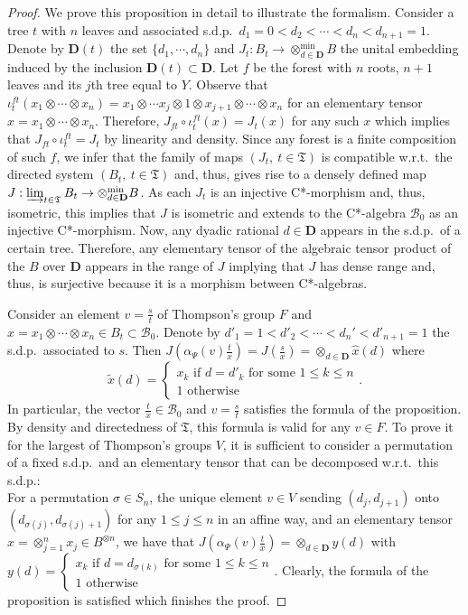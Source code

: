 \documentclass[a4paper,12pt]{amsart}
\numberwithin{equation}{section}
\theoremstyle{definition}
\newcommand{\al}{\alpha}
\newcommand{\scrB}{\mathscr B}
\newcommand{\D}{\mathbf D}
\newcommand{\ot}{\otimes}\newcommand{\otmin}{\otimes_{\text{min}}}
\newcommand{\fT}{\mathfrak T}
\begin{document}
\begin{proof}
We prove this proposition in detail to illustrate the formalism.
Consider a tree $t$ with $n$ leaves and associated s.d.p.~$d_1=0<d_2<\cdots<d_n<d_{n+1}=1$.
Denote by $\D(t)$ the set $\{d_1,\cdots,d_n\}$ and $J_t:B_t\to \otimes_{d\in\D}^{\min} B$ the unital embedding induced by the inclusion $\D(t)\subset \D.$
Let $f$ be the forest with $n$ roots, $n+1$ leaves and its $j$th tree equal to $Y$.
Observe that $\iota_t^{ft}(x_1\ot \cdots \ot x_n) = x_1\ot \cdots x_{j}\ot 1 \ot x_{j+1}\ot\cdots\ot x_n$ for an elementary tensor $x=x_1\ot\cdots\ot x_n$.
Therefore, $J_{ft}\circ \iota_t^{ft}(x) = J_t(x)$ for any such $x$ which implies that $J_{ft}\circ \iota_t^{ft}=J_t$ by linearity and density.
Since any forest is a finite composition of such $f$, we infer that the family of maps $(J_t,\ t\in\fT)$ is compatible w.r.t.~the directed system $(B_t,\ t\in \fT)$ and, thus, gives rise to a densely defined map $J:\varinjlim_{t\in\fT} B_t\to  \otimes_{d\in\D}^{\min} B$.
As each $J_t$ is an injective C*-morphism and, thus, isometric, this implies that $J$ is isometric and extends to the C*-algebra $\scrB_0$ as an injective C*-morphism.
Now, any dyadic rational $d\in\D$ appears in the s.d.p.~of a certain tree.
Therefore, any elementary tensor of the algebraic tensor product of the $B$ over $\D$ appears in the range of $J$ implying that $J$ has dense range and, thus, is surjective because it is a morphism between C*-algebras.

Consider an element  $v=\tfrac{s}{t}$ of Thompson's group $F$ and $x=x_1\ot\cdots\ot x_n\in B_t\subset \scrB_0$.
Denote by $d'_1=1<d'_2<\cdots<d_n'<d'_{n+1}=1$ the s.d.p.~associated to $s$.
Then $J(\al_\Psi(v) \tfrac{t}{x}) = J(\tfrac{s}{x}) = \ot_{d\in\D} \hat x(d)$ where 
$$\tilde x(d)= \begin{cases} x_k \text{ if } d=d'_k \text{ for some } 1\leq k\leq n\\ 1 \text{ otherwise }\end{cases}.$$
In particular, the vector $\tfrac{t}{x}\in \scrB_0$ and $v= \tfrac{s}{t}$ satisfies the formula of the proposition.
By density and directedness of $\fT$, this formula is valid for any $v\in F.$
To prove it for the largest of Thompson's groups $V$, it is sufficient to consider a permutation of a fixed s.d.p.~and an elementary tensor that can be decomposed w.r.t.~this s.d.p.:\\
For a permutation $\sigma\in S_n$, the unique element $v\in V$ sending $(d_j,d_{j+1})$ onto $(d_{\sigma(j)}, d_{\sigma(j)+1})$ for any $1\leq j\leq n$ in an affine way, and an elementary tensor $x=\ot_{j=1}^n x_j \in B^{\ot n}$, we have that $J(\al_\Psi(v) \tfrac{t}{x}) = \ot_{d\in\D} y(d)$ with $y(d) = \begin{cases} x_k \text{ if } d= d_{\sigma(k)} \text{ for some } 1\leq k\leq n\\ 1 \text{ otherwise }\end{cases}.$
Clearly, the formula of the proposition is satisfied which finishes the proof.
\end{proof}
\end{document}

